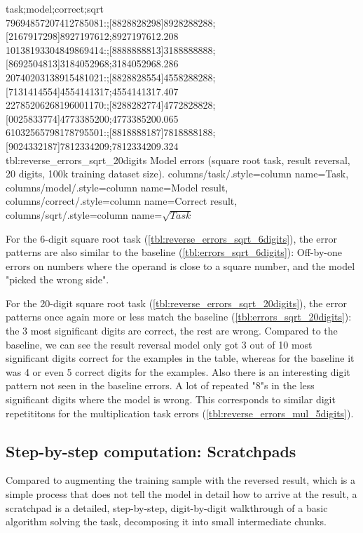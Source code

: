 {
task;model;correct;sqrt\\
79694857207412785081:;[8828828298]8928288288;[2167917298]8927197612;8927197612.208\\
10138193304849869414:;[8888888813]3188888888;[8692504813]3184052968;3184052968.286\\
20740203138915481021:;[8828828554]4558288288;[7131414554]4554141317;4554141317.407\\
22785206268196001170:;[8288282774]4772828828;[0025833774]4773385200;4773385200.065\\
61032565798178795501:;[8818888187]7818888188;[9024332187]7812334209;7812334209.324\\
}
{tbl:reverse_errors_sqrt_20digits}
{
    Model errors (square root task, result reversal, 20 digits, 100k training dataset size).
}
{
    columns/task/.style={column name={Task}},
    columns/model/.style={column name={Model result}},
    columns/correct/.style={column name={Correct result}},
    columns/sqrt/.style={column name={$\sqrt{Task}$}}
}

For the 6-digit square root task (\cref{tbl:reverse_errors_sqrt_6digits}), the error patterns are also similar to the baseline (\cref{tbl:errors_sqrt_6digits}): Off-by-one errors on numbers where the operand is close to a square number, and the model "picked the wrong side".

For the 20-digit square root task (\cref{tbl:reverse_errors_sqrt_20digits}), the error patterns once again more or less match the baseline (\cref{tbl:errors_sqrt_20digits}): the 3 most significant digits are correct, the rest are wrong.
Compared to the baseline, we can see the result reversal model only got 3 out of 10 most significant digits correct for the examples in the table, whereas for the baseline it was 4 or even 5 correct digits for the examples.
Also there is an interesting digit pattern not seen in the baseline errors. A lot of repeated "8"s in the less significant digits where the model is wrong. This corresponds to similar digit repetititons for the multiplication task errors (\cref{tbl:reverse_errors_mul_5digits}).

\subsection{Step-by-step computation: Scratchpads}
\label{scratchpad}

Compared to augmenting the training sample with the reversed result, which is a simple process that does not tell the model in detail how to arrive at the result, a scratchpad is a detailed, step-by-step, digit-by-digit walkthrough of a basic algorithm solving the task, decomposing it into small intermediate chunks.

